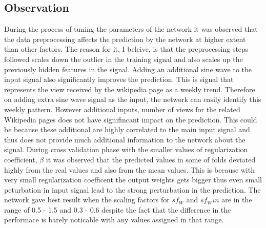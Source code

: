  \subsection{Observation}
 During the process of tuning the parameters of the network it was observed that the data preprocessing affects the prediction by the network at higher extent than other factors. The reason for it, I beleive, is that the preprocessing steps followed scales down the outlier in the training signal and also scales up the previously hidden features in the signal. Adding an additional sine wave to the input signal also significantly improves the prediction.  This is signal that represents the view received by the wikipedia page as a weekly trend. Therefore on adding extra sine wave signal as the input, the network can easily identify this weekly pattern. However additional inputs, number of views for the related Wikipedia pages does not have signifincant impact on the prediction. This could be because these additional are highly correlated to the main input signal and thus does not provide much additional information to the network about the signal. During cross validation phase with the smaller values of regularization coefficient, $\beta$ it was observed that the predicted values in some of folds deviated highly from the real values and also from the mean values. This is because with very small regularization coefficent the output weights gets bigger thus even small peturbation in input signal lead to the strong perturbation in the prediction. The network gave best result when the scaling factors for $sf_W$ and $sf_Win$ are in the range of 0.5 - 1.5 and 0.3 - 0.6 despite the fact that the difference in the performace is barely noticable with any values assigned in that range. 
 
 
 